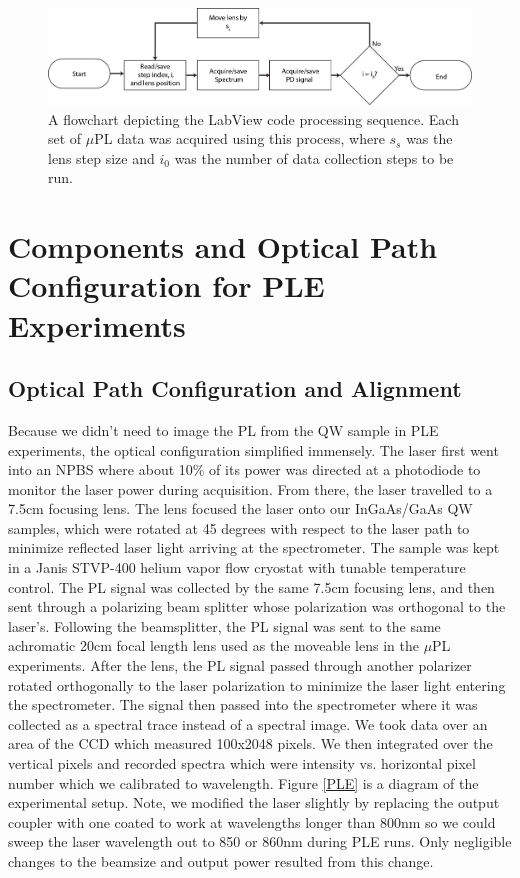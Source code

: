 \begin{figure}[t]
\centering
\includegraphics[width = 1\textwidth]{softflow.png}
\caption{ \doublespacing A flowchart depicting the LabView code processing sequence. Each set of $\mu$PL data was acquired using this process, where $s_s$ was the lens step size and $i_0$ was the number of data collection steps to be run.}
\label{flowit}
\end{figure}

\section{Components and Optical Path Configuration for PLE Experiments}
\subsection{Optical Path Configuration and Alignment}
Because we didn't need to image the PL from the QW sample in PLE experiments, the optical configuration simplified immensely. The laser first went into an NPBS where about 10\% of its power was directed at a photodiode to monitor the laser power during acquisition. From there, the laser travelled to a 7.5cm focusing lens. The lens focused the laser onto our InGaAs/GaAs QW samples, which were rotated at 45 degrees with respect to the laser path to minimize reflected laser light arriving at the spectrometer. The sample was kept in a Janis STVP-400 helium vapor flow cryostat with tunable temperature control. The PL signal was collected by the same 7.5cm focusing lens, and then sent through a polarizing beam splitter whose polarization was orthogonal to the laser's. Following the beamsplitter, the PL signal was sent to the same achromatic 20cm focal length lens used as the moveable lens in the $\mu$PL experiments. After the lens, the PL signal passed through another polarizer rotated orthogonally to the laser polarization to minimize the laser light entering the spectrometer. The signal then passed into the spectrometer where it was collected as a spectral trace instead of a spectral image. We took data over an area of the CCD which measured 100x2048 pixels. We then integrated over the vertical pixels and recorded spectra which were intensity vs. horizontal pixel number which we calibrated to wavelength. Figure \ref{PLE} is a diagram of the experimental setup. Note, we modified the laser slightly by replacing the output coupler with one coated to work at wavelengths longer than 800nm so we could sweep the laser wavelength out to 850 or 860nm during PLE runs. Only negligible changes to the beamsize and output power resulted from this change.


